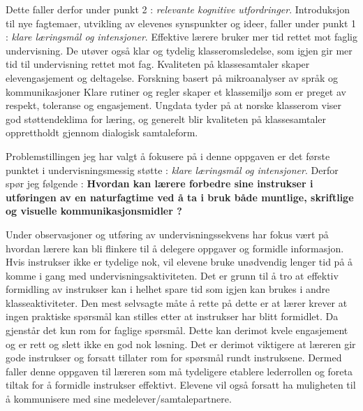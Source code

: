 \documentclass[main.tex]{subfiles}
\begin{document}
Dette faller derfor under punkt 2 : \emph{relevante kognitive utfordringer}. 
Introduksjon til nye fagtemaer, utvikling av elevenes synspunkter og ideer, faller under punkt 1 : 
\emph{klare læringsmål og intensjoner}. Effektive lærere bruker mer tid rettet mot faglig undervisning. 
De utøver også klar og tydelig klasseromsledelse, som igjen gir mer tid til undervisning rettet mot fag. 
Kvaliteten på klassesamtaler skaper elevengasjement og deltagelse. Forskning basert på mikroanalyser av språk
og kommunikasjoner
Klare rutiner og regler skaper et klassemiljø som er preget av respekt, toleranse og engasjement. Ungdata
tyder på at norske klasserom viser god støttendeklima for læring, og generelt blir kvaliteten på klassesamtaler
opprettholdt gjennom dialogisk samtaleform.

Problemstillingen jeg har valgt å fokusere på i denne oppgaven er det første punktet i undervisningsmessig støtte : 
\emph{klare læringsmål og intensjoner}. Derfor spør jeg følgende :
\newline
\textbf{Hvordan kan lærere forbedre sine instrukser i utføringen av en naturfagtime ved å ta i bruk både muntlige,
skriftlige og visuelle kommunikasjonsmidler ?}
\newline

Under observasjoner og utføring av undervisningssekvens har fokus vært på hvordan 
lærere kan bli flinkere til å delegere oppgaver og formidle 
informasjon. Hvis instrukser ikke er tydelige nok, vil elevene bruke unødvendig 
lenger tid på å komme i gang med undervisningsaktiviteten. Det 
er grunn til å tro at effektiv formidling av instrukser kan i 
helhet spare tid som igjen kan brukes i andre klasseaktiviteter. Den mest selvsagte måte
å rette på dette er at lærer krever at ingen praktiske
spørsmål kan stilles etter at instrukser har blitt formidlet. Da gjenstår
det kun rom for faglige spørsmål. Dette kan derimot kvele engasjement og er
rett og slett ikke en god nok løsning. Det er derimot viktigere at læreren
gir gode instrukser og forsatt tillater rom for spørsmål rundt instruksene.
Dermed faller denne oppgaven til læreren som må tydeligere
etablere lederrollen og foreta tiltak for å formidle instrukser 
effektivt. Elevene vil også forsatt ha muligheten til å kommunisere med sine 
medelever/samtalepartnere.
\end{document}
